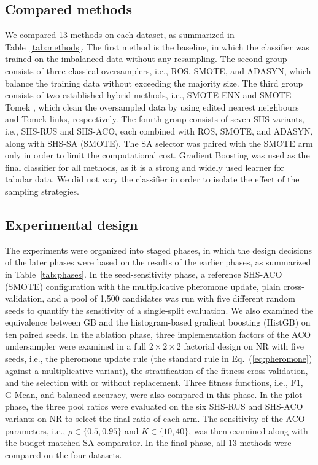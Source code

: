 \documentclass[10pt,a4paper]{article}
\begin{document}
\subsection{Compared methods}
We compared 13 methods on each dataset, as summarized in
Table~\ref{tab:methods}. The first method is the
baseline, in which the classifier was trained on the imbalanced data
without any resampling. The second group consists of three classical
oversamplers, i.e., ROS, SMOTE, and ADASYN, which balance the training
data without exceeding the majority size. The third group consists of
two established hybrid methods, i.e., SMOTE-ENN and SMOTE-Tomek
\citep{batista2004study}, which clean the oversampled data by using
edited nearest neighbours and Tomek links, respectively. The fourth
group consists of seven SHS variants, i.e., SHS-RUS and SHS-ACO, each
combined with ROS, SMOTE, and ADASYN, along with SHS-SA (SMOTE). The SA
selector was paired with the SMOTE arm only in order to limit the
computational cost. Gradient Boosting \citep{friedman2001greedy} was used as the final
classifier for all methods, as it is a strong and widely used learner
for tabular data. We did not vary the
classifier in order to isolate the effect of the sampling strategies.

\begin{table}[htbp]
\centering
\caption{The 13 compared methods.}
\label{tab:methods}
\end{table}

\subsection{Experimental design}
\label{sec:design}
The experiments were organized into staged phases, in which the design
decisions of the later phases were based on the results of the earlier
phases, as summarized in Table~\ref{tab:phases}. In the seed-sensitivity phase, a reference SHS-ACO (SMOTE) configuration with the multiplicative pheromone update, plain cross-validation, and a pool of 1,500 candidates was run with five different random seeds to quantify the
sensitivity of a single-split evaluation. We also examined the
equivalence between GB and the histogram-based gradient boosting
(HistGB) on ten paired seeds. In the ablation phase, three
implementation factors of the ACO undersampler were examined in a full
$2\times2\times2$ factorial design on NR with five seeds, i.e., the
pheromone update rule (the standard rule in Eq.~(\ref{eq:pheromone})
against a multiplicative variant), the
stratification of the fitness cross-validation, and the selection with
or without replacement. Three fitness functions, i.e., F1, G-Mean, and
balanced accuracy, were also compared in this phase. In the pilot phase,
the three pool ratios were evaluated on the six SHS-RUS and SHS-ACO
variants on NR to select the final ratio of each arm. The sensitivity of
the ACO parameters, i.e., $\rho \in \{0.5, 0.95\}$ and
$K \in \{10, 40\}$, was then examined along with the budget-matched SA
comparator. In the final phase, all 13 methods were compared on the four
datasets.
\end{document}
